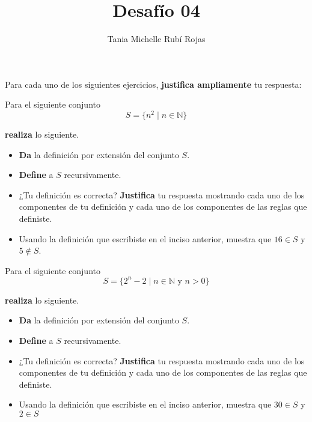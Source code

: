 \documentclass[oneside]{style}
\title{Desafío 04}
\author{Tania Michelle Rubí Rojas}
\begin{document}
\maketitle

Para cada uno de los siguientes ejercicios, \textbf{justifica ampliamente} tu 
respuesta:

\begin{questions}[label=\protect\circled{\bfseries\arabic*}]
    \question
    {
        Para el siguiente conjunto 
        \begin{equation*}
            S = \{n^2 \; | \; n \in \mathbb{N}\}
        \end{equation*}

        \textbf{realiza} lo siguiente.
        \begin{itemize}
            \item \textbf{Da} la definición por extensión del conjunto $S$.
            \item \textbf{Define} a $S$ recursivamente.
            \item ¿Tu definición es correcta? \textbf{Justifica} tu respuesta 
            mostrando cada uno de los componentes de tu definición y cada uno 
            de los componentes de las reglas que definiste. 
            \item Usando la definición que escribiste en el inciso anterior, 
            muestra que $16 \in S$ y $5 \not \in S$.  
        \end{itemize}
    }

    \question
    {
        Para el siguiente conjunto 
        \begin{equation*}
            S = \{2^n - 2 \; | \; n \in \mathbb{N} \text{ y } n > 0\}
        \end{equation*}

        \textbf{realiza} lo siguiente.
        \begin{itemize}
            \item \textbf{Da} la definición por extensión del conjunto $S$.
            \item \textbf{Define} a $S$ recursivamente.
            \item ¿Tu definición es correcta? \textbf{Justifica} tu respuesta 
            mostrando cada uno de los componentes de tu definición y cada uno 
            de los componentes de las reglas que definiste. 
            \item Usando la definición que escribiste en el inciso anterior, 
            muestra que $30 \in S$ y $2 \in S$
        \end{itemize}
    }


\end{questions}
\end{document}

